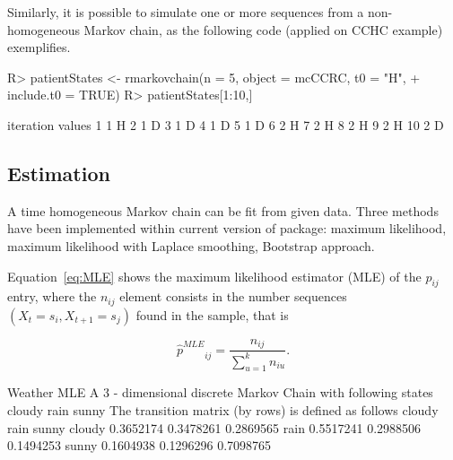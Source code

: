 \documentclass[nojss]{jss}
\begin{document}
Similarly, it is possible to simulate one or more sequences from a non-homogeneous Markov chain, 
as the following code (applied on CCHC example) exemplifies.

\begin{Schunk}
\begin{Sinput}
R> patientStates <- rmarkovchain(n = 5, object = mcCCRC, t0 = "H", 
+                                include.t0 = TRUE)
R> patientStates[1:10,]
\end{Sinput}
\begin{Soutput}
   iteration values
1          1      H
2          1      D
3          1      D
4          1      D
5          1      D
6          2      H
7          2      H
8          2      H
9          2      H
10         2      D
\end{Soutput}
\end{Schunk}

\subsection{Estimation}

A time homogeneous Markov chain can be fit from given data. Three methods have been implemented within current version of
 package: maximum likelihood, maximum likelihood with Laplace
smoothing, Bootstrap approach.

Equation~\ref{eq:MLE} shows the maximum likelihood estimator (MLE) of the
$p_{ij}$ entry, where the $n_{ij}$ element consists in the number sequences $\left( X_{t}=s_{i}, X_{t+1}=s_{j}\right)$
found in the sample, that is

\begin{equation}
{\hat p^{MLE}}_{ij} = \frac{{{n_{ij}}}}{{\sum\limits_{u = 1}^k {{n_{iu}}} }}.
\label{eq:MLE}
\end{equation}


\begin{Schunk}
\begin{Soutput}
Weather MLE 
 A  3 - dimensional discrete Markov Chain with following states 
 cloudy rain sunny 
 The transition matrix   (by rows)  is defined as follows 
          cloudy      rain     sunny
cloudy 0.3652174 0.3478261 0.2869565
rain   0.5517241 0.2988506 0.1494253
sunny  0.1604938 0.1296296 0.7098765
\end{Soutput}
\end{Schunk}
\end{document}
